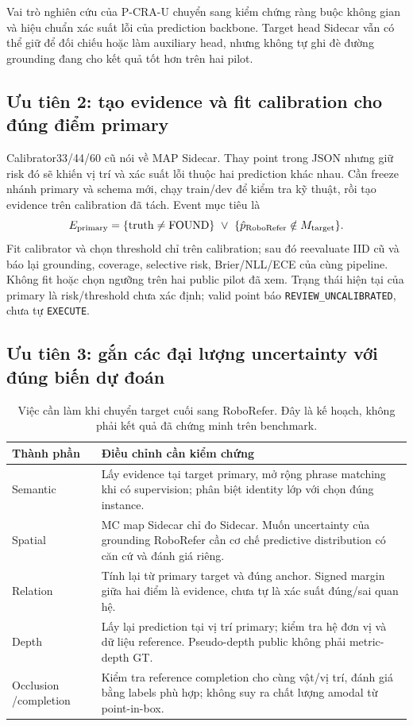 \documentclass[11pt,a4paper]{article}
\begin{document}
Vai trò nghiên cứu của P-CRA-U chuyển sang kiểm chứng ràng buộc không gian
và hiệu chuẩn xác suất lỗi của prediction backbone. Target head Sidecar vẫn
có thể giữ để đối chiếu hoặc làm auxiliary head, nhưng không tự ghi đè
đường grounding đang cho kết quả tốt hơn trên hai pilot.

\subsection{Ưu tiên 2: tạo evidence và fit calibration cho đúng điểm primary}
Calibrator33/44/60 cũ nói về MAP Sidecar. Thay point trong JSON nhưng giữ
risk đó sẽ khiến vị trí và xác suất lỗi thuộc hai prediction khác nhau.
Cần freeze nhánh primary và schema mới, chạy train/dev để kiểm tra kỹ thuật,
rồi tạo evidence trên calibration đã tách. Event mục tiêu là
\[
E_{\rm primary}
= \{\mathrm{truth}\ne\mathrm{FOUND}\}
\ \lor\ \{\hat p_{\rm RoboRefer}\notin M_{\rm target}\}.
\]
Fit calibrator và chọn threshold chỉ trên calibration; sau đó reevaluate IID
cũ và báo lại grounding, coverage, selective risk, Brier/NLL/ECE của cùng
pipeline. Không fit hoặc chọn ngưỡng trên hai public pilot đã xem.
Trạng thái hiện tại của primary là risk/threshold chưa xác định;
valid point báo \texttt{REVIEW\_UNCALIBRATED}, chưa tự \texttt{EXECUTE}.

\subsection{Ưu tiên 3: gắn các đại lượng uncertainty với đúng biến dự đoán}
\begin{table}[H]\centering\small
\caption{Việc cần làm khi chuyển target cuối sang RoboRefer. Đây là kế hoạch,
không phải kết quả đã chứng minh trên benchmark.}
\begin{tabularx}{\linewidth}{P{2.8cm} Y}
\toprule
Thành phần & Điều chỉnh cần kiểm chứng\\
\midrule
Semantic & Lấy evidence tại target primary, mở rộng phrase matching khi có supervision; phân biệt identity lớp với chọn đúng instance.\\
Spatial & MC map Sidecar chỉ đo Sidecar. Muốn uncertainty của grounding RoboRefer cần cơ chế predictive distribution có căn cứ và đánh giá riêng.\\
Relation & Tính lại từ primary target và đúng anchor. Signed margin giữa hai điểm là evidence, chưa tự là xác suất đúng/sai quan hệ.\\
Depth & Lấy lại prediction tại vị trí primary; kiểm tra hệ đơn vị và dữ liệu reference. Pseudo-depth public không phải metric-depth GT.\\
Occlusion /\newline completion & Kiểm tra reference completion cho cùng vật/vị trí, đánh giá bằng labels phù hợp; không suy ra chất lượng amodal từ point-in-box.\\
\bottomrule
\end{tabularx}
\end{table}
\end{document}
